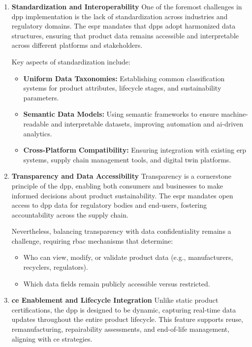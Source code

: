 \begin{enumerate}[itemsep=0.5\baselineskip]
    \item \textbf{Standardization and Interoperability}  
    One of the foremost challenges in \ac{dpp} implementation is the lack of standardization across industries and regulatory domains. The \ac{espr} mandates that \ac{dpp}s adopt harmonized data structures, ensuring that product data remains accessible and interpretable across different platforms and stakeholders. \autocite[1781, Articles 9 and 10]{EuropeanParliamentandCouncil.2024}

    Key aspects of standardization include:
    \vspace{5pt}
    \begin{itemize}
        \item \textbf{Uniform Data Taxonomies:} Establishing common classification systems for product attributes, lifecycle stages, and sustainability parameters. \autocite{HerasSaizarbitoria.2024}
        \item \textbf{Semantic Data Models:} Using semantic frameworks to ensure machine-readable and interpretable datasets, improving automation and \ac{ai}-driven analytics.\autocite{Kebede.2024}
        \item \textbf{Cross-Platform Compatibility:} Ensuring integration with existing \ac{erp} systems, supply chain management tools, and digital twin platforms. \autocite{Pietron.2023}
    \end{itemize}

    \item \textbf{Transparency and Data Accessibility}  
    Transparency is a cornerstone principle of the \ac{dpp}, enabling both consumers and businesses to make informed decisions about product sustainability. The \ac{espr} mandates open access to \ac{dpp} data for regulatory bodies and end-users, fostering accountability across the supply chain. \autocite[1781, Articles 9, 10 and 15]{EuropeanParliamentandCouncil.2024}

    Nevertheless, balancing transparency with data confidentiality remains a challenge, requiring \ac{rbac} mechanisms that determine:
    \vspace{5pt}
    \begin{itemize}
        \item Who can view, modify, or validate product data (e.g., manufacturers, recyclers, regulators).
        \item Which data fields remain publicly accessible versus restricted. \autocite{Ducuing.2023}
    \end{itemize}

    \item \textbf{\acrlong{ce} Enablement and Lifecycle Integration}  
    Unlike static product certifications, the \ac{dpp} is designed to be dynamic, capturing real-time data updates throughout the entire product lifecycle. This feature supports reuse, remanufacturing, repairability assessments, and end-of-life management, aligning with \acrlong{ce} strategies. \autocite{Kuhn.2025}
    
\end{enumerate}

